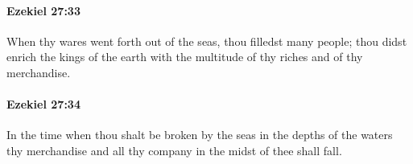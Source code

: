		\paragraph{Ezekiel 27:33} %
			\label{EZEKIEL-27-33}

			When thy wares went forth out of the seas, thou filledst many people; thou didst enrich the kings of the earth with the multitude of thy riches and of thy merchandise.


		\paragraph{Ezekiel 27:34} %
			\label{EZEKIEL-27-34}

			In the time when thou shalt be broken by the seas in the depths of the waters thy merchandise and all thy company in the midst of thee shall fall.


